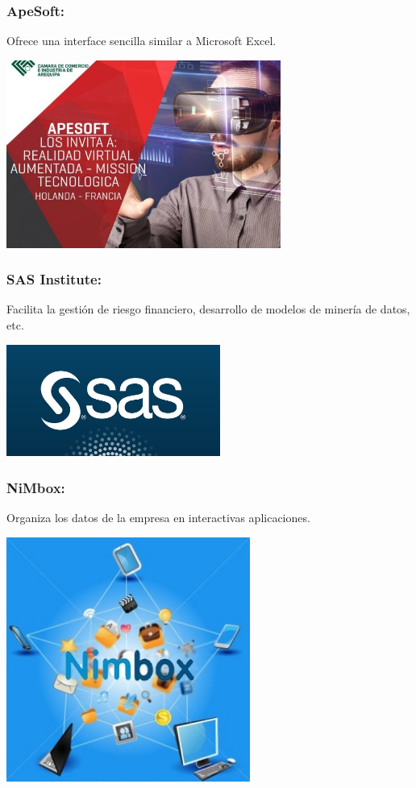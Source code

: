 \subsubsection{ApeSoft: }\label{sec:nada2}  
Ofrece una interface sencilla similar a Microsoft Excel.
	\begin{center}
	\includegraphics[width=9cm]{./Imagenes/BIimagen18}
	\end{center}
	
\subsubsection{SAS Institute: }\label{sec:nada2}  
Facilita la gestión de riesgo financiero, desarrollo de modelos de minería de datos, etc.
	\begin{center}
	\includegraphics[width=7cm]{./Imagenes/BIimagen19}
	\end{center}
	
\subsubsection{NiMbox: }\label{sec:nada2}  
Organiza los datos de la empresa en interactivas aplicaciones.
	\begin{center}
	\includegraphics[width=8cm]{./Imagenes/BIimagen20}
	\end{center}


